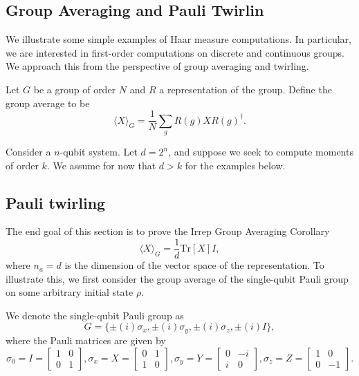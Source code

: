 \subsection{Group Averaging and Pauli Twirlin}
We illustrate some simple examples of Haar measure computations.
In particular, we are interested in first-order computations on discrete and continuous groups.
We approach this from the perspective of group averaging and twirling.
\begin{definition}\label{def:GroupAverage}
    Let $G$ be a group of order $N$ and $R$ a representation of the group.
    Define the {group average} to be
    \begin{equation}
        \langle X \rangle_{G} = \frac{1}{N} \sum_{g} R(g) X R(g)^{\dagger}.
    \end{equation}
\end{definition}

\begin{remark}[Assumptions]
    Consider a $n$-qubit system. Let $d = 2^n$, and suppose we seek to compute moments of order $k$.
    We assume for now that $d > k$ for the examples below.
\end{remark}

\subsection{Pauli twirling}
The end goal of this section is to prove the Irrep Group Averaging Corollary
\begin{equation}
    \langle X \rangle_{G} = \frac{1}{d} \text{Tr}[X] I,
\end{equation}
where $n_a = d$ is the dimension of the vector space of the representation.
To illustrate this, we first consider the group average of the single-qubit Pauli group on some arbitrary initial state $\rho$.
\begin{remark}\label{rm:PauliGroup}
    We denote the single-qubit Pauli group as
    \begin{equation}
        G = \{\pm(i) \sigma_{x}, \pm(i) \sigma_y, \pm (i) \sigma_z, \pm (i) I\},
    \end{equation}
    where the Pauli matrices are given by
    \begin{equation}
        \sigma_0 = I = \begin{bmatrix} 1 & 0 \\ 0 & 1 \end{bmatrix},
        \sigma_{x} = X = \begin{bmatrix} 0 & 1 \\ 1 & 0 \end{bmatrix},
        \sigma_y = Y = \begin{bmatrix} 0 & -i \\ i & 0 \end{bmatrix},
        \sigma_z = Z = \begin{bmatrix} 1 & 0 \\ 0 & -1 \end{bmatrix}.
    \end{equation}
\end{remark}

